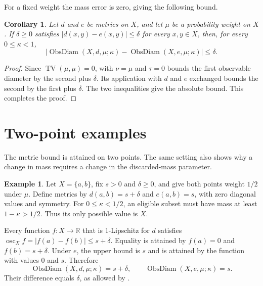 \documentclass[a4paper,11pt]{article}
\newtheorem{corollary}[theorem]{Corollary}
\theoremstyle{definition}
\newtheorem{example}[theorem]{Example}
\DeclareMathOperator{\ObsDiam}{ObsDiam}
\DeclareMathOperator{\TV}{TV}
\DeclareMathOperator{\osc}{osc}
\begin{document}
For a fixed weight the mass error is zero, giving the following bound.

\begin{corollary}\label{cor:metric}
Let $d$ and $e$ be metrics on $X$, and let $\mu$ be a probability weight on $X$. If $\delta\geq0$ satisfies $|d(x,y)-e(x,y)|\leq\delta$ for every $x,y\in X$, then, for every $0\leq\kappa<1$,
\[ |\ObsDiam(X,d,\mu;\kappa)-\ObsDiam(X,e,\mu;\kappa)|\leq\delta. \]
\end{corollary}
\begin{proof}
Since $\TV(\mu,\mu)=0$,  with $\nu=\mu$ and $\tau=0$ bounds the first observable diameter by the second plus $\delta$. Its application with $d$ and $e$ exchanged bounds the second by the first plus $\delta$. The two inequalities give the absolute bound. This completes the proof.
\end{proof}

\section{Two-point examples}\label{sec:examples}

The metric bound is attained on two points. The same setting also shows why a change in mass requires a change in the discarded-mass parameter.

\begin{example}\label{ex:metric}
Let $X=\{a,b\}$, fix $s>0$ and $\delta\geq0$, and give both points weight $1/2$ under $\mu$. Define metrics by $d(a,b)=s+\delta$ and $e(a,b)=s$, with zero diagonal values and symmetry. For $0\leq\kappa<1/2$, an eligible subset must have mass at least $1-\kappa>1/2$. Thus its only possible value is $X$.

Every function $f\colon X\to\mathbb R$ that is $1$-Lipschitz for $d$ satisfies $\osc_X f=|f(a)-f(b)|\leq s+\delta$. Equality is attained by $f(a)=0$ and $f(b)=s+\delta$. Under $e$, the upper bound is $s$ and is attained by the function with values $0$ and $s$. Therefore
\[ \ObsDiam(X,d,\mu;\kappa)=s+\delta,\qquad \ObsDiam(X,e,\mu;\kappa)=s. \]
Their difference equals $\delta$, as allowed by .
\end{example}
\end{document}
